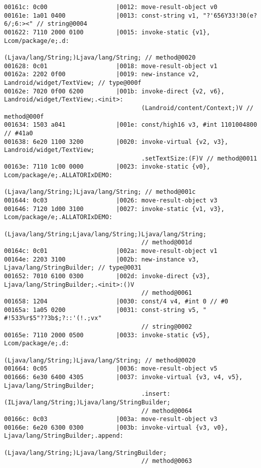 \begin{lstlisting}
00161c: 0c00                   |0012: move-result-object v0
00161e: 1a01 0400              |0013: const-string v1, "?'656Y33!30(e?6/;6:><" // string@0004
001622: 7110 2000 0100         |0015: invoke-static {v1}, Lcom/package/e;.d:
                                      (Ljava/lang/String;)Ljava/lang/String; // method@0020
001628: 0c01                   |0018: move-result-object v1
00162a: 2202 0f00              |0019: new-instance v2, Landroid/widget/TextView; // type@000f
00162e: 7020 0f00 6200         |001b: invoke-direct {v2, v6}, Landroid/widget/TextView;.<init>:
                                      (Landroid/content/Context;)V // method@000f
001634: 1503 a041              |001e: const/high16 v3, #int 1101004800 // #41a0
001638: 6e20 1100 3200         |0020: invoke-virtual {v2, v3}, Landroid/widget/TextView;
                                      .setTextSize:(F)V // method@0011
00163e: 7110 1c00 0000         |0023: invoke-static {v0}, Lcom/package/e;.ALLATORIxDEMO:
                                      (Ljava/lang/String;)Ljava/lang/String; // method@001c
001644: 0c03                   |0026: move-result-object v3
001646: 7120 1d00 3100         |0027: invoke-static {v1, v3}, Lcom/package/e;.ALLATORIxDEMO:
                                      (Ljava/lang/String;Ljava/lang/String;)Ljava/lang/String;
                                      // method@001d
00164c: 0c01                   |002a: move-result-object v1
00164e: 2203 3100              |002b: new-instance v3, Ljava/lang/StringBuilder; // type@0031
001652: 7010 6100 0300         |002d: invoke-direct {v3}, Ljava/lang/StringBuilder;.<init>:()V
                                      // method@0061
001658: 1204                   |0030: const/4 v4, #int 0 // #0
00165a: 1a05 0200              |0031: const-string v5, "	#!533%r$5"??3b$;?::'(!.;vx"
                                      // string@0002
00165e: 7110 2000 0500         |0033: invoke-static {v5}, Lcom/package/e;.d:
                                      (Ljava/lang/String;)Ljava/lang/String; // method@0020
001664: 0c05                   |0036: move-result-object v5
001666: 6e30 6400 4305         |0037: invoke-virtual {v3, v4, v5}, Ljava/lang/StringBuilder;
                                      .insert:(ILjava/lang/String;)Ljava/lang/StringBuilder;
                                      // method@0064
00166c: 0c03                   |003a: move-result-object v3
00166e: 6e20 6300 0300         |003b: invoke-virtual {v3, v0}, Ljava/lang/StringBuilder;.append:
                                      (Ljava/lang/String;)Ljava/lang/StringBuilder;
                                      // method@0063

\end{lstlisting}
